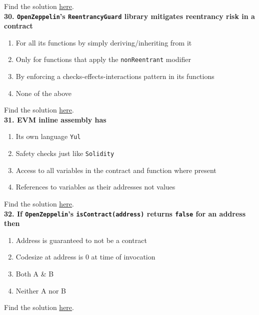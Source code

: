 Find the solution \hyperref[sec:exam3_q29]{here}.\\

\textbf{30. \texttt{OpenZeppelin}'s \texttt{ReentrancyGuard} library mitigates reentrancy risk in a contract}

\begin{enumerate}[label=\Alph*.]
    \item For all its functions by simply deriving/inheriting from it
    \item Only for functions that apply the \verb|nonReentrant| modifier
    \item By enforcing a checks-effects-interactions pattern in its functions
    \item None of the above
\end{enumerate}

Find the solution \hyperref[sec:exam3_q30]{here}.\\

\textbf{31. EVM inline assembly has}

\begin{enumerate}[label=\Alph*.]
    \item Its own language \verb|Yul|
    \item Safety checks just like \verb|Solidity|
    \item Access to all variables in the contract and function where present
    \item References to variables as their addresses not values
\end{enumerate}

Find the solution \hyperref[sec:exam3_q31]{here}.\\

\textbf{32. If \texttt{OpenZeppelin}'s \texttt{isContract(address)} returns \texttt{false} for an address then}

\begin{enumerate}[label=\Alph*.]
    \item Address is guaranteed to not be a contract
    \item Codesize at address is 0 at time of invocation
    \item Both A \& B
    \item Neither A nor B
\end{enumerate}

Find the solution \hyperref[sec:exam3_q32]{here}.\\